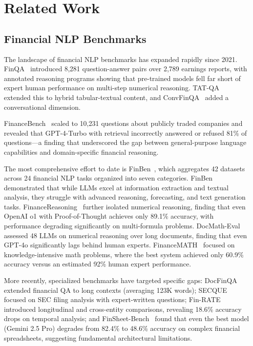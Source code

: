 \documentclass[11pt]{article}
\begin{document}
\section{Related Work}
\label{sec:related}

\subsection{Financial NLP Benchmarks}
\label{sec:related:benchmarks}

The landscape of financial NLP benchmarks has expanded rapidly since 2021.
FinQA~\citep{chen2021finqa} introduced 8,281 question-answer pairs over 2,789 earnings reports, with annotated reasoning programs showing that pre-trained models fell far short of expert human performance on multi-step numerical reasoning.
TAT-QA~\citep{zhu2021tatqa} extended this to hybrid tabular-textual content, and ConvFinQA~\citep{chen2022convfinqa} added a conversational dimension.

FinanceBench~\citep{islam2023financebench} scaled to 10,231 questions about publicly traded companies and revealed that GPT-4-Turbo with retrieval incorrectly answered or refused 81\% of questions---a finding that underscored the gap between general-purpose language capabilities and domain-specific financial reasoning.

The most comprehensive effort to date is FinBen~\citep{xie2024finben}, which aggregates 42 datasets across 24 financial NLP tasks organized into seven categories.
FinBen demonstrated that while LLMs excel at information extraction and textual analysis, they struggle with advanced reasoning, forecasting, and text generation tasks.
FinanceReasoning~\citep{tang2025financereasoning} further isolated numerical reasoning, finding that even OpenAI o1 with Proof-of-Thought achieves only 89.1\% accuracy, with performance degrading significantly on multi-formula problems.
DocMath-Eval~\citep{zhao2024docmatheval} assessed 48 LLMs on numerical reasoning over long documents, finding that even GPT-4o significantly lags behind human experts.
FinanceMATH~\citep{zhao2024financemath} focused on knowledge-intensive math problems, where the best system achieved only 60.9\% accuracy versus an estimated 92\% human expert performance.

More recently, specialized benchmarks have targeted specific gaps: DocFinQA~\citep{reddy2024docfinqa} extended financial QA to long contexts (averaging 123K words); SECQUE~\citep{benyoash2025secque} focused on SEC filing analysis with expert-written questions; Fin-RATE~\citep{jiang2026finrate} introduced longitudinal and cross-entity comparisons, revealing 18.6\% accuracy drops on temporal analysis; and FinSheet-Bench~\citep{finsheetbench2026} found that even the best model (Gemini 2.5 Pro) degrades from 82.4\% to 48.6\% accuracy on complex financial spreadsheets, suggesting fundamental architectural limitations.
\end{document}
